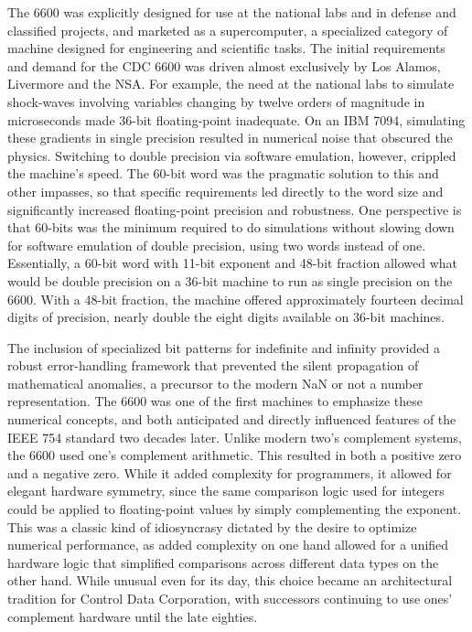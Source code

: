 The 6600 was explicitly designed for use at the national labs and in defense and classified projects, and marketed as a supercomputer, a specialized category of machine designed for engineering and scientific tasks. The initial requirements and demand for the CDC 6600 was driven almost exclusively by Los Alamos, Livermore and the NSA. For example, the need at the national labs to simulate shock-waves involving variables changing by twelve orders of magnitude in microseconds made 36-bit floating-point inadequate. On an IBM 7094, simulating these gradients in single precision resulted in numerical noise that obscured the physics. Switching to double precision via software emulation, however, crippled the machine's speed. The 60-bit word was the pragmatic solution to this and other impasses, so that specific requirements led directly to the word size and significantly increased floating-point precision and robustness. One perspective is that 60-bits was the minimum required to do simulations without slowing down for software emulation of double precision, using two words instead of one. Essentially, a 60-bit word with 11-bit exponent and 48-bit fraction allowed what would be double precision on a 36-bit machine to run as single precision on the 6600. With a 48-bit fraction, the machine offered approximately fourteen decimal digits of precision, nearly double the eight digits available on 36-bit machines. 

The inclusion of specialized bit patterns for indefinite and infinity provided a robust error-handling framework that prevented the silent propagation of mathematical anomalies, a precursor to the modern NaN or not a number representation. The 6600 was one of the first machines to emphasize these numerical concepts, and both anticipated and directly influenced features of the IEEE 754 standard two decades later. Unlike modern two’s complement systems, the 6600 used one’s complement arithmetic. This resulted in both a positive zero and a negative zero. While it added complexity for programmers, it allowed for elegant hardware symmetry, since the same comparison logic used for integers could be applied to floating-point values by simply complementing the exponent. This was a classic kind of idiosyncrasy dictated by the desire to optimize numerical performance, as added complexity on one hand allowed for a unified hardware logic that simplified comparisons across different data types on the other hand. While unusual even for its day, this choice became an architectural tradition for Control Data Corporation, with successors continuing to use ones' complement hardware until the late eighties. 


